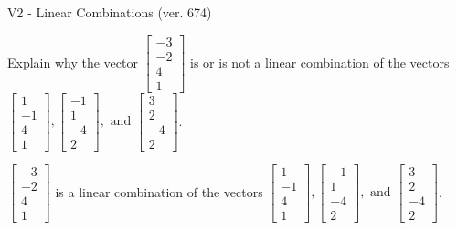 \begin{exercise}
  \begin{exerciseTitle}V2 - Linear Combinations (ver. 674)\end{exerciseTitle}
  \begin{exerciseStatement}
    Explain why the vector \(\left[\begin{array}{c}
-3 \\
-2 \\
4 \\
1
\end{array}\right]\)  is or is not a linear 
	combination of the vectors \(\left[\begin{array}{c}
1 \\
-1 \\
4 \\
1
\end{array}\right] , \left[\begin{array}{c}
-1 \\
1 \\
-4 \\
2
\end{array}\right] , \text{ and } \left[\begin{array}{c}
3 \\
2 \\
-4 \\
2
\end{array}\right]\).
	


  \end{exerciseStatement}
  \begin{exerciseAnswer}
   \(\left[\begin{array}{c}
-3 \\
-2 \\
4 \\
1
\end{array}\right]\) 
  	 is  
	a linear combination of the vectors \(\left[\begin{array}{c}
1 \\
-1 \\
4 \\
1
\end{array}\right] , \left[\begin{array}{c}
-1 \\
1 \\
-4 \\
2
\end{array}\right] , \text{ and } \left[\begin{array}{c}
3 \\
2 \\
-4 \\
2
\end{array}\right]\).

	
  


  \end{exerciseAnswer}
\end{exercise}